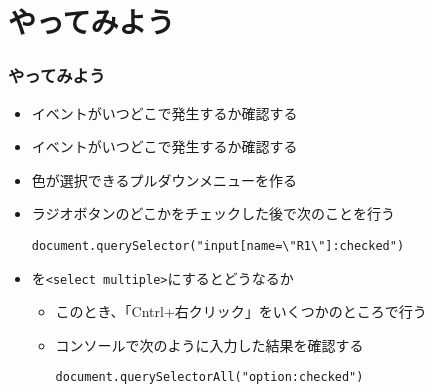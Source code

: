  \section{やってみよう}
\begin{frame}[containsverbatim]
 \frametitle{やってみよう}
 \begin{itemize}
  \item {}イベントがいつどこで発生するか確認する
  \item {}イベントがいつどこで発生するか確認する
  \item 色が選択できるプルダウンメニューを作る
  \item ラジオボタンのどこかをチェックした後で次のことを行う

        \Verb+document.querySelector("input[name=\"R1\"]:checked")+
  \item {}を\texttt{<select multiple>}にするとどうなるか
        \begin{itemize}
         \item このとき、「Cntrl+右クリック」をいくつかのところで行う
         \item コンソールで次のように入力した結果を確認する
               
               \texttt{document.querySelectorAll("option:checked")}
        \end{itemize}
 \end{itemize}
\end{frame}

\begin{frame}[containsverbatim]
 \frametitle{}
\end{frame}
